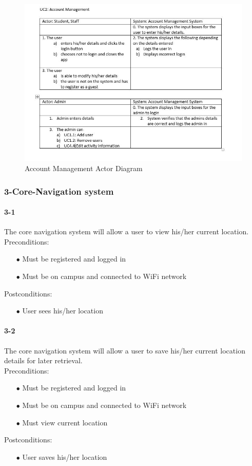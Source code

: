 \documentclass[a4paper,12pt]{article}
\begin{document}
\begin{figure}[H]
\includegraphics[width=\textwidth]{ActorDiagrams/AccManagementAD.JPG}
\caption{Account Management Actor Diagram}
\label{fig:Account Management Actor Diagram}
\end{figure}


\subsubsection{3-Core-Navigation system}

\paragraph{3-1}
The core navigation system will allow a user to view his/her current location.\\
Preconditions:
\begin{itemize}
	\item[$\bullet$] Must be registered and logged in
	\item[$\bullet$] Must be on campus and connected to WiFi network
\end{itemize}
Postconditions:
\begin{itemize}
	\item[$\bullet$] User sees his/her location
\end{itemize}
\paragraph{3-2}
The core navigation system will allow a user to save his/her current location details for later retrieval.\\
Preconditions:
\begin{itemize}
	\item[$\bullet$] Must be registered and logged in
	\item[$\bullet$] Must be on campus and connected to WiFi network
	\item[$\bullet$] Must view current location
\end{itemize}
Postconditions:
\begin{itemize}
	\item[$\bullet$] User saves his/her location
\end{itemize}
\end{document}
